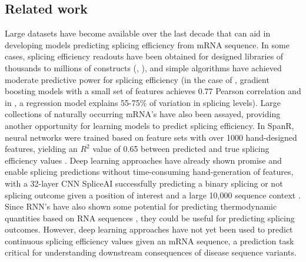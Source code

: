 \documentclass{article}
\begin{document}
\subsection{Related work}
Large datasets have become available over the last decade that can aid in developing models predicting splicing efficiency from mRNA sequence. In some cases, splicing efficiency readouts have been obtained for designed libraries of thousands to millions of constructs (\cite{pilpel}, \cite{seelig}), and simple algorithms have achieved moderate predictive power for splicing efficiency (in the case of \cite{pilpel}, gradient boosting models with a small set of features achieves 0.77 Pearson correlation and in \cite{seelig}, a regression model explains 55-75\% of variation in splicing levels). Large collections of naturally occurring mRNA's have also been assayed, providing another opportunity for learning models to predict splicing efficiency. In SpanR, neural networks were trained based on feature sets with over 1000 hand-designed features, yielding an $R^2$ value of 0.65 between predicted and true splicing efficiency values \cite{spanr}. Deep learning approaches have already shown promise and enable splicing predictions without time-consuming hand-generation of features, with a 32-layer CNN SpliceAI successfully predicting a binary splicing or not splicing outcome given a position of interest and a large 10,000 sequence context \cite{spliceai}. Since RNN's have also shown some potential for predicting thermodynamic quantities based on RNA sequences \cite{rnn}, they could be useful for predicting splicing outcomes. However, deep learning approaches have not yet been used to predict continuous splicing efficiency values given an mRNA sequence, a prediction task critical for understanding downstream consequences of disease sequence variants.
\end{document}
